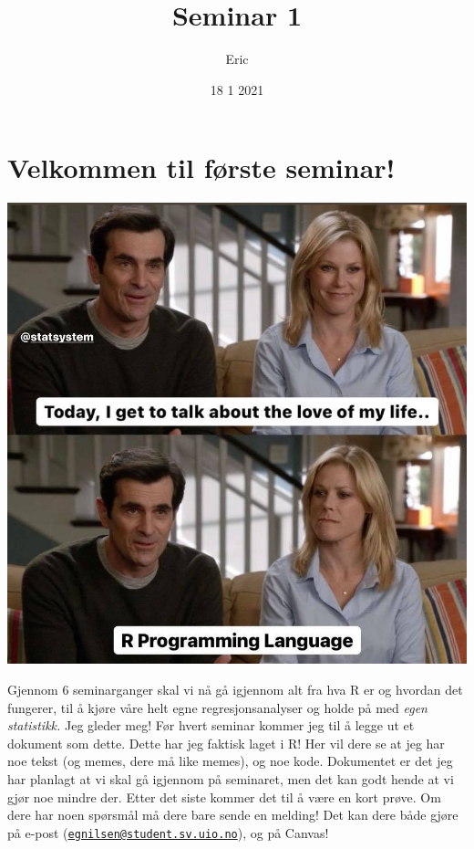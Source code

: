 \documentclass[
]{article}
\title{Seminar 1}
\author{Eric}
\date{18 1 2021}
\begin{document}
\maketitle

\hypertarget{velkommen-til-fuxf8rste-seminar}{%
\section{Velkommen til første
seminar!}\label{velkommen-til-fuxf8rste-seminar}}

\includegraphics{Bilder/Lovememe.png}

Gjennom 6 seminarganger skal vi nå gå igjennom alt fra hva R er og
hvordan det fungerer, til å kjøre våre helt egne regresjonsanalyser og
holde på med \emph{egen statistikk.} Jeg gleder meg! Før hvert seminar
kommer jeg til å legge ut et dokument som dette. Dette har jeg faktisk
laget i R! Her vil dere se at jeg har noe tekst (og memes, dere må like
memes), og noe kode. Dokumentet er det jeg har planlagt at vi skal gå
igjennom på seminaret, men det kan godt hende at vi gjør noe mindre der.
Etter det siste kommer det til å være en kort prøve. Om dere har noen
spørsmål må dere bare sende en melding! Det kan dere både gjøre på
e-post
(\href{mailto:egnilsen@student.sv.uio.no}{\nolinkurl{egnilsen@student.sv.uio.no}}),
og på Canvas!
\end{document}
